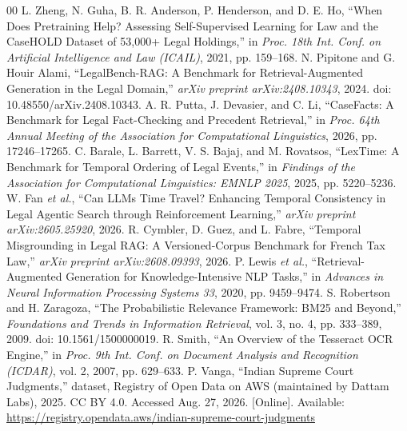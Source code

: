 \documentclass[conference]{IEEEtran}
\begin{document}
\begin{thebibliography}{00}
 L. Zheng, N. Guha, B. R. Anderson, P. Henderson, and D. E. Ho, ``When Does Pretraining Help? Assessing Self-Supervised Learning for Law and the CaseHOLD Dataset of 53,000+ Legal Holdings,'' in \textit{Proc. 18th Int. Conf. on Artificial Intelligence and Law (ICAIL)}, 2021, pp. 159--168.
 N. Pipitone and G. Houir Alami, ``LegalBench-RAG: A Benchmark for Retrieval-Augmented Generation in the Legal Domain,'' \textit{arXiv preprint arXiv:2408.10343}, 2024. doi: 10.48550/arXiv.2408.10343.
 A. R. Putta, J. Devasier, and C. Li, ``CaseFacts: A Benchmark for Legal Fact-Checking and Precedent Retrieval,'' in \textit{Proc. 64th Annual Meeting of the Association for Computational Linguistics}, 2026, pp. 17246--17265.
 C. Barale, L. Barrett, V. S. Bajaj, and M. Rovatsos, ``LexTime: A Benchmark for Temporal Ordering of Legal Events,'' in \textit{Findings of the Association for Computational Linguistics: EMNLP 2025}, 2025, pp. 5220--5236.
 W. Fan \textit{et al.}, ``Can LLMs Time Travel? Enhancing Temporal Consistency in Legal Agentic Search through Reinforcement Learning,'' \textit{arXiv preprint arXiv:2605.25920}, 2026.
 R. Cymbler, D. Guez, and L. Fabre, ``Temporal Misgrounding in Legal RAG: A Versioned-Corpus Benchmark for French Tax Law,'' \textit{arXiv preprint arXiv:2608.09393}, 2026.
 P. Lewis \textit{et al.}, ``Retrieval-Augmented Generation for Knowledge-Intensive NLP Tasks,'' in \textit{Advances in Neural Information Processing Systems 33}, 2020, pp. 9459--9474.
 S. Robertson and H. Zaragoza, ``The Probabilistic Relevance Framework: BM25 and Beyond,'' \textit{Foundations and Trends in Information Retrieval}, vol. 3, no. 4, pp. 333--389, 2009. doi: 10.1561/1500000019.
 R. Smith, ``An Overview of the Tesseract OCR Engine,'' in \textit{Proc. 9th Int. Conf. on Document Analysis and Recognition (ICDAR)}, vol. 2, 2007, pp. 629--633.
 P. Vanga, ``Indian Supreme Court Judgments,'' dataset, Registry of Open Data on AWS (maintained by Dattam Labs), 2025. CC BY 4.0. Accessed Aug. 27, 2026. [Online]. Available: \url{https://registry.opendata.aws/indian-supreme-court-judgments}
\end{thebibliography}
\end{document}
